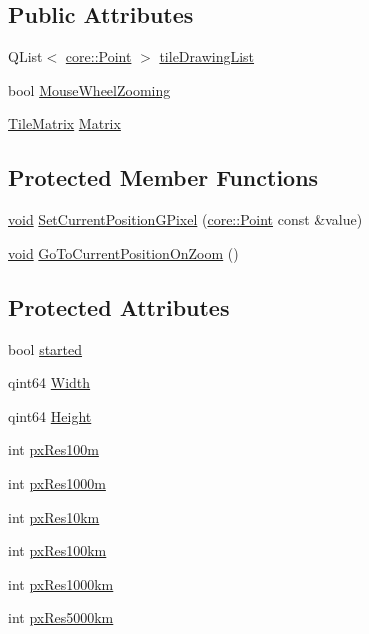 \subsection*{\-Public \-Attributes}
\begin{DoxyCompactItemize}
\item 
\-Q\-List$<$ \hyperlink{structcore_1_1_point}{core\-::\-Point} $>$ \hyperlink{group___o_p_map_widget_gaef8eae2b290cfd062061e8baaebe51d6}{tile\-Drawing\-List}
\item 
bool \hyperlink{group___o_p_map_widget_ga051b1520271b875b55fa1023041a16e6}{\-Mouse\-Wheel\-Zooming}
\item 
\hyperlink{classinternals_1_1_tile_matrix}{\-Tile\-Matrix} \hyperlink{group___o_p_map_widget_ga4ac91c5f728a51e821a9cec0abf347fd}{\-Matrix}
\end{DoxyCompactItemize}
\subsection*{\-Protected \-Member \-Functions}
\begin{DoxyCompactItemize}
\item 
\hyperlink{group___u_a_v_objects_plugin_ga444cf2ff3f0ecbe028adce838d373f5c}{void} \hyperlink{group___o_p_map_widget_ga8d0da9c286137deb71b187c5b003d968}{\-Set\-Current\-Position\-G\-Pixel} (\hyperlink{structcore_1_1_point}{core\-::\-Point} const \&value)
\item 
\hyperlink{group___u_a_v_objects_plugin_ga444cf2ff3f0ecbe028adce838d373f5c}{void} \hyperlink{group___o_p_map_widget_ga65f1168da5561bfccb2ac0053f031027}{\-Go\-To\-Current\-Position\-On\-Zoom} ()
\end{DoxyCompactItemize}
\subsection*{\-Protected \-Attributes}
\begin{DoxyCompactItemize}
\item 
bool \hyperlink{group___o_p_map_widget_ga797e80c1349c656593de207aa74935de}{started}
\item 
qint64 \hyperlink{group___o_p_map_widget_ga3d5e76b481e1832dff58d33176b6a158}{\-Width}
\item 
qint64 \hyperlink{group___o_p_map_widget_ga9a5a3c48699aba8ef9582514fca243f0}{\-Height}
\item 
int \hyperlink{group___o_p_map_widget_ga0f93533bcdd67093c6da41e069997291}{px\-Res100m}
\item 
int \hyperlink{group___o_p_map_widget_gaa0947582a08d181d668db653fa4ed991}{px\-Res1000m}
\item 
int \hyperlink{group___o_p_map_widget_gaff97208acbd79e92f35d678a5651d063}{px\-Res10km}
\item 
int \hyperlink{group___o_p_map_widget_gab81b3e64348e0d02e67bd4f7350656cc}{px\-Res100km}
\item 
int \hyperlink{group___o_p_map_widget_ga5abde0bbaaa9517978da18398333e69b}{px\-Res1000km}
\item 
int \hyperlink{group___o_p_map_widget_gaed5c41c8c2b585074948d5918ae1a480}{px\-Res5000km}
\end{DoxyCompactItemize}
